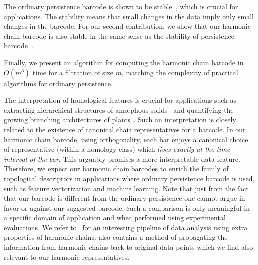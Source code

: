 \documentclass[10pt,a4paper]{amsart}
\newcommand{\hcb}{{harmonic chain barcode}}
\newcommand{\hcbs}{{harmonic chain barcodes}}
\theoremstyle{definition}
\newcommand{\Salman}[1]{{\color{violet}[#1]}}
\theoremstyle{remark}
\begin{document}
The ordinary persistence barcode is shown to be stable~\cite{Cohen-SteinerEdelsbrunnerHarer2005}, which is crucial for applications. The stability means that small changes in the data imply only small changes in the barcode. For our second contribution, we show that our {\hcb} is also stable in the same sense as the stability of persistence barcode~\cite{Cohen-SteinerEdelsbrunnerHarer2005}. 

Finally, we present an algorithm for computing 
the {\hcb} in $O(m^3)$ time for a filtration of size $m$,
matching the complexity of practical algorithms for ordinary persistence.

The interpretation of homological features is crucial for applications such as extracting hierarchical structures of amorphous solids~\cite{hiraoka2016hierarchical} and quantifying the growing branching architectures of plants~\cite{LiDuncanTopp2017}.
Such an interpretation is closely related to the existence of canonical chain representatives for a barcode. 
In our harmonic chain barcode, using orthogonality, each bar enjoys a canonical choice of representative (within a homology class) which \emph{lives exactly at the time-interval of the bar}. This arguably promises a more interpretable data feature. Therefore, we expect our {\hcbs} to enrich the family of topological descriptors in applications where ordinary persistence barcode is used, such as feature vectorization and machine learning. Note that just from the fact that our barcode is different from the ordinary persistence one cannot argue in favor or against our suggested barcode. Such a comparison is only meaningful in a specific domain of application and when performed using experimental evaluations. We refer to~\cite{GurnariGuzman-SaenzUtro2023} for an interesting pipeline of data analysis using extra properties of harmonic chains. \cite{GurnariGuzman-SaenzUtro2023} also contains a method of propagating the information from harmonic chains back to original data points which we find also relevant to our harmonic representatives.





\end{document}
